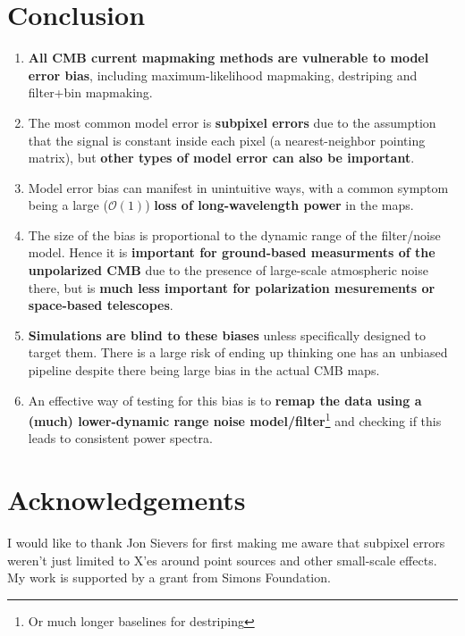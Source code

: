 \documentclass[twocolumn,apj]{aastex63}
\begin{document}
\section{Conclusion}

\begin{enumerate}
	\item \textbf{All CMB current mapmaking methods are vulnerable to model error bias},
		including maximum-likelihood mapmaking, destriping and filter+bin mapmaking.
	\item The most common model error is \textbf{subpixel errors} due to the assumption that
		the signal is constant inside each pixel (a nearest-neighbor pointing matrix),
		but \textbf{other types of model error can also be important}.
	\item Model error bias can manifest in unintuitive ways, with a common symptom
		being a large ($\mathcal{O}(1)$) \textbf{loss of long-wavelength power} in the maps.
	\item The size of the bias is proportional to the dynamic range of the filter/noise model.
		Hence it is \textbf{important for ground-based measurments of the unpolarized CMB}
		due to the presence of large-scale atmospheric noise there, but is \textbf{much less
		important for polarization mesurements or space-based telescopes}.
	\item \textbf{Simulations are blind to these biases} unless specifically designed to
		target them. There is a large risk of ending up thinking one has an unbiased
		pipeline despite there being large bias in the actual CMB maps.
	\item An effective way of testing for this bias is to \textbf{remap the data using a
		(much) lower-dynamic range noise model/filter}\footnote{Or much longer baselines for destriping}
		and checking if this leads to consistent power spectra.
\end{enumerate}

\section*{Acknowledgements}
I would like to thank Jon Sievers for first making me aware
that subpixel errors weren't just limited to X'es around point
sources and other small-scale effects.
My work is supported by a grant from Simons Foundation.



\end{document}
